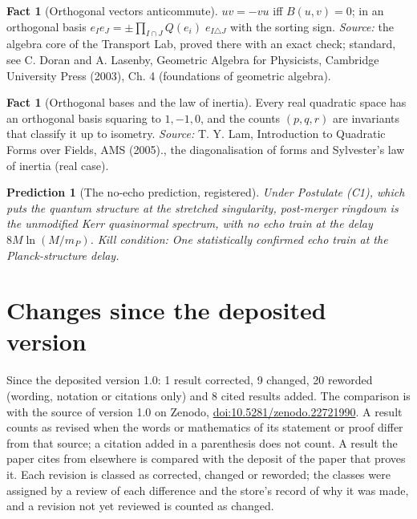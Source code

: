 \documentclass[11pt]{article}
\newtheorem{prediction}[theorem]{Prediction}
\theoremstyle{definition}
\newtheorem{fact}[theorem]{Fact}
\theoremstyle{plain}
\begin{document}
\begin{fact}[Orthogonal vectors anticommute]\label{c:std-algebra.orthogonal-anticommute}
$uv = -vu$ iff $B(u,v) = 0$; in an orthogonal basis $e_I e_J = \pm \prod_{I \cap J} Q(e_i)\; e_{I \triangle J}$ with the sorting sign.
\emph{Source:} the algebra core of the Transport Lab, proved there with an exact check; standard, see C. Doran and A. Lasenby, Geometric Algebra for Physicists, Cambridge University Press (2003), Ch. 4 (foundations of geometric algebra).
\end{fact}

\begin{fact}[Orthogonal bases and the law of inertia]\label{c:std-algebra.sylvester-inertia}
Every real quadratic space has an orthogonal basis squaring to $1, -1, 0$, and the counts $(p, q, r)$ are invariants that classify it up to isometry.
\emph{Source:} T. Y. Lam, Introduction to Quadratic Forms over Fields, AMS (2005)., the diagonalisation of forms and Sylvester's law of inertia (real case).
\end{fact}

\begin{prediction}[The no-echo prediction, registered]\label{c:scrambling.no-echo-prediction-registered}
Under Postulate (C1), which puts the quantum structure at the stretched singularity, post-merger ringdown is the unmodified Kerr quasinormal spectrum, with no echo train at the delay $8M\ln(M/m_P)$.
\emph{Kill condition:} One statistically confirmed echo train at the Planck-structure delay.
\end{prediction}

\section*{Changes since the deposited version}
Since the deposited version 1.0: 1 result corrected, 9 changed, 20 reworded (wording, notation or citations only) and 8 cited results added. The comparison is with the source of version 1.0 on Zenodo, \href{https://doi.org/10.5281/zenodo.22721990}{doi:10.5281/zenodo.22721990}. A result counts as revised when the words or mathematics of its statement or proof differ from that source; a citation added in a parenthesis does not count. A result the paper cites from elsewhere is compared with the deposit of the paper that proves it. Each revision is classed as corrected, changed or reworded; the classes were assigned by a review of each difference and the store's record of why it was made, and a revision not yet reviewed is counted as changed.
\end{document}
